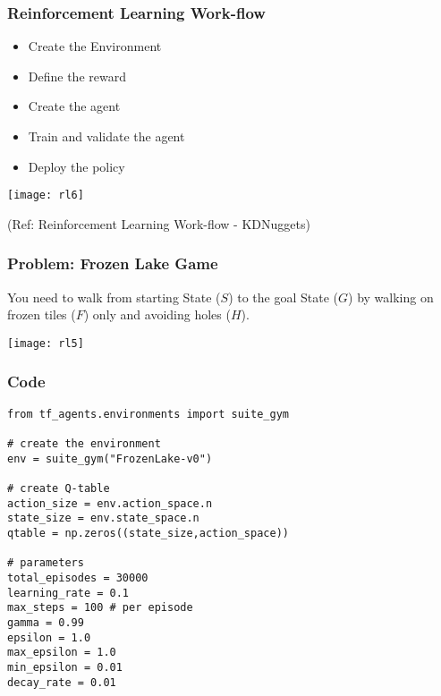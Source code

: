 \begin{frame}[fragile]\frametitle{Reinforcement Learning Work-flow}

\begin{itemize}
\item Create the Environment
\item Define the reward
\item Create the agent
\item Train and validate the agent
\item Deploy the policy
\end{itemize}

\begin{center}
\texttt{[image: rl6]}

{\tiny (Ref: Reinforcement Learning Work-flow - KDNuggets)} 
\end{center}

\end{frame}



\begin{frame}[fragile]\frametitle{Problem: Frozen Lake Game}


You need to walk from starting State ($S$) to the goal State ($G$) by walking on frozen tiles ($F$) only and avoiding holes ($H$).


\begin{center}
\texttt{[image: rl5]}
\end{center}

\end{frame}

\begin{frame}[fragile]\frametitle{Code}

\begin{lstlisting}
from tf_agents.environments import suite_gym

# create the environment
env = suite_gym("FrozenLake-v0")

# create Q-table
action_size = env.action_space.n
state_size = env.state_space.n
qtable = np.zeros((state_size,action_space))

# parameters
total_episodes = 30000
learning_rate = 0.1
max_steps = 100 # per episode
gamma = 0.99
epsilon = 1.0
max_epsilon = 1.0
min_epsilon = 0.01
decay_rate = 0.01

\end{lstlisting}

\end{frame}


